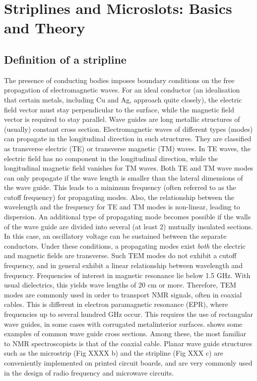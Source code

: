 \section{Striplines and Microslots: Basics and
Theory}\label{striplines-and-microslots-basics-and-theory}

\subsection{Definition of a
stripline}\label{definition-of-a-stripline}

The presence of conducting bodies imposes boundary conditions on the
free propagation of electromagnetic waves. For an ideal conductor (an
idealisation that certain metals, including Cu and Ag, approach quite
closely), the electric field vector must stay perpendicular to the
surface, while the magnetic field vector is required to stay parallel.
Wave guides are long metallic structures of (usually) constant cross
section. Electromagnetic waves of different types (modes) can propagate
in the longitudinal direction in such structures. They are classified as
transverse electric (TE) or transverse magnetic (TM) waves. In TE waves,
the electric field has no component in the longitudinal direction, while
the longitudinal magnetic field vanishes for TM waves. Both TE and TM
wave modes can only propagate if the wave length is smaller than the
lateral dimensions of the wave guide. This leads to a minimum frequency
(often referred to as the cutoff frequency) for propagating modes. Also,
the relationship between the wavelength and the frequency for TE and TM
modes is non-linear, leading to dispersion. An additional type of
propagating mode becomes possible if the walls of the wave guide are
divided into several (at least 2) mutually insulated sections. In this
case, an oscillatory voltage can be sustained between the separate
conductors. Under these conditions, a propagating modes exist
\textit{both} the electric and magnetic fields are transverse. Such TEM
modes do not exhibit a cutoff frequency, and in general exhibit a linear
relationship between wavelength and frequency. Frequencies of interest
in magnetic resonance lie below 1.5 GHz. With usual dielectrics, this
yields wave lengths of 20 cm or more. Therefore, TEM modes are commonly
used in order to transport NMR signals, often in coaxial cables. This is
different in electron paramagnetic resonance (EPR), where frequencies up
to several hundred GHz occur. This requires the use of rectangular wave
guides, in some cases with corrugated metalinterior surfaces. 
shows some examples of common wave guide cross sections. Among these,
the most familiar to NMR spectroscopists is that of the coaxial cable.
Planar wave guide structures such as the microstrip (Fig XXXX b) and the
stripline (Fig XXX c) are conveniently implemented on printed circuit
boards, \cite{Barret:1955ie} and are very commonly used in the design of
radio frequency and microwave circuits.

